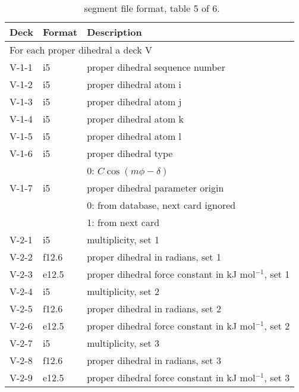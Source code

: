 \begin{table}[htbp]
\begin{center}
\begin{tabular*}{150mm}{p{12mm}p{12mm}l}
\hline\hline
Deck & Format & Description \\ \hline
\multicolumn{3}{l}{For each proper dihedral a deck V} \\
V-1-1 & i5     & proper dihedral sequence number \\
V-1-2 & i5     & proper dihedral atom i \\
V-1-3 & i5     & proper dihedral atom j \\
V-1-4 & i5     & proper dihedral atom k \\
V-1-5 & i5     & proper dihedral atom l \\
V-1-6 & i5     & proper dihedral type \\
      &        & 0: $C\cos(m\phi-\delta)$\\
V-1-7 & i5     & proper dihedral parameter origin\\
      &        & 0: from database, next card ignored \\
      &        & 1: from next card\\
V-2-1 & i5     & multiplicity, set 1\\
V-2-2 & f12.6  & proper dihedral in radians, set 1\\
V-2-3 & e12.5  & proper dihedral force constant in kJ mol$^{-1}$, set 1 \\
V-2-4 & i5     & multiplicity, set 2\\
V-2-5 & f12.6  & proper dihedral in radians, set 2\\
V-2-6 & e12.5  & proper dihedral force constant in kJ mol$^{-1}$, set 2 \\
V-2-7 & i5     & multiplicity, set 3\\
V-2-8 & f12.6  & proper dihedral in radians, set 3\\
V-2-9 & e12.5  & proper dihedral force constant in kJ mol$^{-1}$, set 3 \\
\hline
\end{tabular*}
\caption{\nwargos\ segment file format, table 5 of 6.\label{tbl:nwaseg5}}
\end{center}
\end{table}

